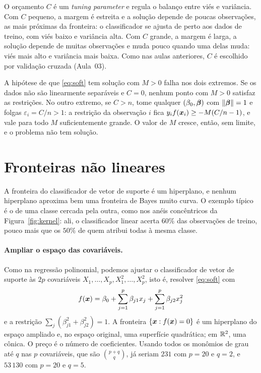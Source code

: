\documentclass[11pt,a4paper]{article}
\begin{document}
\begin{ideia}
O orçamento $C$ é um \emph{tuning parameter} e regula o balanço entre viés e
variância. Com $C$ pequeno, a margem é estreita e a solução depende de poucas
observações, as mais próximas da fronteira: o classificador se ajusta de perto aos
dados de treino, com viés baixo e variância alta. Com $C$ grande, a margem é larga, a
solução depende de muitas observações e muda pouco quando uma delas muda: viés mais
alto e variância mais baixa. Como nas aulas anteriores, $C$ é escolhido por validação
cruzada (Aula~03).
\end{ideia}

\begin{observacao}\label{obs:faixaC}
A hipótese de que \eqref{eq:soft} tem solução com $M>0$ falha nos dois extremos. Se os
dados não são linearmente separáveis e $C=0$, nenhum ponto com $M>0$ satisfaz as
restrições. No outro extremo, se $C>n$, tome qualquer $(\beta_0,\bm{\beta})$ com
$\left\lVert \bm{\beta} \right\rVert=1$ e folgas $\varepsilon_i=C/n>1$: a restrição da observação $i$ fica
$y_if(\bm{x}_i)\ge-M(C/n-1)$, e vale para todo $M$ suficientemente grande. O valor de $M$
cresce, então, sem limite, e o problema não tem solução.
\end{observacao}

\section{Fronteiras não lineares}
A fronteira do classificador de vetor de suporte é um hiperplano, e nenhum hiperplano
aproxima bem uma fronteira de Bayes muito curva. O exemplo típico é o de uma classe
cercada pela outra, como nos anéis concêntricos da Figura~\ref{fig:kernel}: ali, o
classificador linear acerta $60\%$ das observações de treino, pouco mais que os
$50\%$ de quem atribui todas à mesma classe.

\paragraph{Ampliar o espaço das covariáveis.} Como na regressão polinomial, podemos
ajustar o classificador de vetor de suporte às $2p$ covariáveis
$X_1,\dots,X_p,X_1^2,\dots,X_p^2$, isto é, resolver \eqref{eq:soft} com
\[
  f(\bm{x})=\beta_0+\sum_{j=1}^p\beta_{j1}x_j+\sum_{j=1}^p\beta_{j2}x_j^2
\]
e a restrição $\sum_j(\beta_{j1}^2+\beta_{j2}^2)=1$. A fronteira $\{\bm{x}: f(\bm{x})=0\}$ é um
hiperplano do espaço ampliado e, no espaço original, uma superfície quadrática; em
$\mathbb{R}^2$, uma cônica. O preço é o número de coeficientes. Usando todos os monômios de
grau até $q$ nas $p$ covariáveis, que são $\binom{p+q}{q}$, já seriam $231$ com $p=20$
e $q=2$, e $53\,130$ com $p=20$ e $q=5$.
\end{document}

